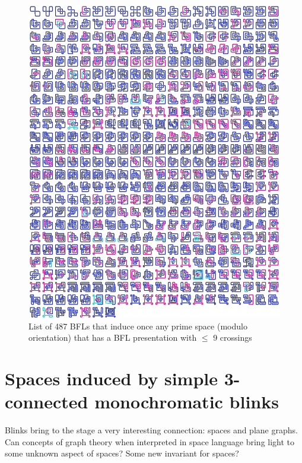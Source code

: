 \begin{figure}[h!tp]
   \begin{center}
      \leavevmode
      \includegraphics[width=15cm]{fig/primeSpace487RepresentantLinks.eps}
   \end{center}
   \vspace{-0.7cm}
   \caption{ List of 487 BFLs that induce once any prime space (modulo orientation)
   that has a BFL presentation with $\leq$ 9 crossings}
   \label{fig:primeSpace487RepresentativeLinks}
\end{figure}

\newpage

\section{Spaces induced by simple 3-connected monochromatic blinks}

Blinks bring to the stage a very interesting connection: spaces and
plane graphs. Can concepts of graph theory when interpreted in space
language bring light to some unknown aspect of spaces? Some new
invariant for spaces?

